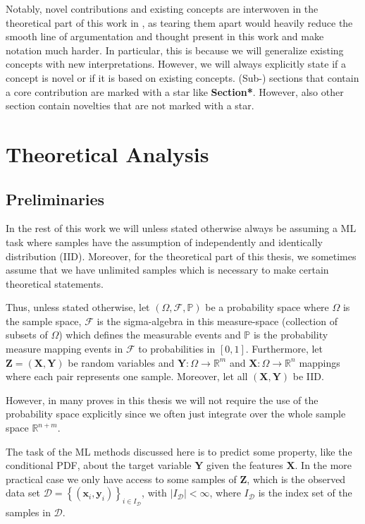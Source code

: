 Notably, novel contributions and existing concepts are interwoven in the theoretical part of this work in , as tearing them apart would heavily reduce the smooth line of argumentation and thought present in this work and make notation much harder. In particular, this is because we will generalize existing concepts with new interpretations. However, we will always explicitly state if a concept is novel or if it is based on existing concepts. (Sub-) sections that contain a core contribution are marked with a star like \textbf{Section*}. However, also other section contain novelties that are not marked with a star.

\chapter{Theoretical Analysis}\label{chap:theoretical}

\section{Preliminaries}\label{sec:preliminaries}

In the rest of this work we will unless stated otherwise always be assuming a ML task where samples have the assumption of independently and identically distribution (IID). Moreover, for the theoretical part of this thesis, we sometimes assume that we have unlimited samples which is necessary to make certain theoretical statements.

Thus, unless stated otherwise, let $\left(\Omega, \mathcal{F}, \mathbb{P}\right)$ be a probability space where $\Omega$ is the sample space, $\mathcal{F}$ is the sigma-algebra in this measure-space (collection of subsets of $\Omega$) which defines the measurable events and $\mathbb{P}$ is the probability measure mapping events in $\mathcal{F}$ to probabilities in $\left[0,1\right]$. Furthermore, let $\mathbf{Z} = (\mathbf{X}, \mathbf{Y})$ be random variables and $\mathbf{Y}: \Omega \to \mathbb{R}^m$ and $\mathbf{X}: \Omega \to \mathbb{R}^n$ mappings where each pair represents one sample. Moreover, let all $(\mathbf{X}, \mathbf{Y})$ be IID.\@

However, in many proves in this thesis we will not require the use of the probability space explicitly since we often just integrate over the whole sample space $\mathbb{R}^{n+m}$.

The task of the ML methods discussed here is to predict some property, like the conditional PDF, about the target variable $\mathbf{Y}$ given the features $\mathbf{X}$. In the more practical case we only have access to some samples of $\mathbf{Z}$, which is the observed data set $\mathcal{D} = \left\{\left(\mathbf{x}_i, \mathbf{y}_i\right)\right\}_{i\in I_{\mathcal{D}}}$, with $|I_{\mathcal{D}}| < \infty$, where $I_{\mathcal{D}}$ is the index set of the samples in $\mathcal{D}$.

